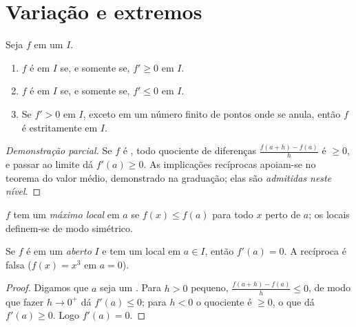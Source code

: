 \section{Variação e extremos}

\begin{theorem}\label{thm:g12:deriv:variations}
Seja $f$  em um  $I$.
\begin{enumerate}
  \item $f$ é  em $I$ se, e somente se, $f' \geq 0$ em $I$.
  \item $f$ é  em $I$ se, e somente se, $f' \leq 0$ em $I$.
  \item Se $f' > 0$ em $I$, exceto em um número finito de pontos onde se
        anula, então $f$ é estritamente  em $I$.
\end{enumerate}
\end{theorem}

\begin{proof}[Demonstração parcial]
Se $f$ é , todo quociente de diferenças
$\frac{f(a+h)-f(a)}{h}$ é $\geq 0$, e passar ao limite dá
$f'(a) \geq 0$. As implicações recíprocas apoiam-se no teorema do valor
médio, demonstrado na graduação; elas são \emph{admitidas neste nível}.
\end{proof}

\begin{definition}\label{def:g12:deriv:extremum}
$f$ tem um \emph{máximo local} em $a$ se $f(x) \leq f(a)$
para todo $x$ perto de $a$; os  locais definem-se de modo
simétrico.
\end{definition}

\begin{proposition}\label{prop:g12:deriv:critical}
Se $f$ é  em um  \emph{aberto} $I$ e tem um 
local em $a \in I$, então $f'(a) = 0$. A recíproca é falsa
($f(x) = x^3$ em $a = 0$).
\end{proposition}

\begin{proof}
Digamos que $a$ seja um . Para $h > 0$ pequeno,
$\frac{f(a+h)-f(a)}{h} \leq 0$, de modo que fazer $h \to 0^+$ dá
$f'(a) \leq 0$; para $h < 0$ o quociente é $\geq 0$, o que dá
$f'(a) \geq 0$. Logo $f'(a) = 0$.
\end{proof}

